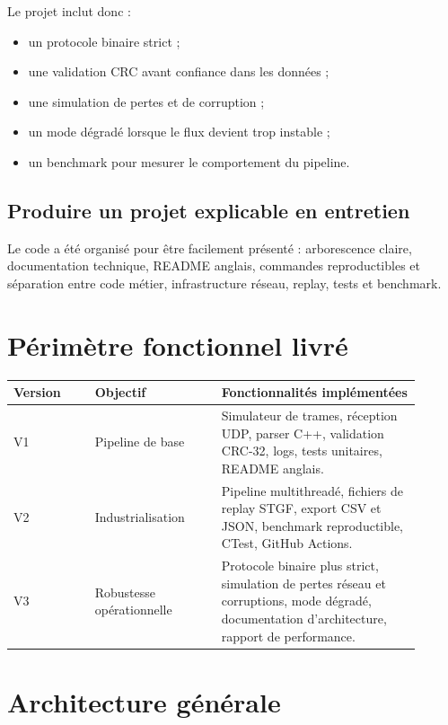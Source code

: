 \documentclass[11pt,a4paper]{article}
\begin{document}
Le projet inclut donc :

\begin{itemize}[nosep]
    \item un protocole binaire strict ;
    \item une validation CRC avant confiance dans les données ;
    \item une simulation de pertes et de corruption ;
    \item un mode dégradé lorsque le flux devient trop instable ;
    \item un benchmark pour mesurer le comportement du pipeline.
\end{itemize}

\subsection{Produire un projet explicable en entretien}

Le code a été organisé pour être facilement présenté : arborescence claire, documentation technique, README anglais, commandes reproductibles et séparation entre code métier, infrastructure réseau, replay, tests et benchmark.

\section{Périmètre fonctionnel livré}

\begin{longtable}{p{0.18\linewidth} p{0.28\linewidth} p{0.44\linewidth}}
\toprule
\textbf{Version} & \textbf{Objectif} & \textbf{Fonctionnalités implémentées} \\
\midrule
V1 & Pipeline de base & Simulateur de trames, réception UDP, parser C++, validation CRC-32, logs, tests unitaires, README anglais. \\
\addlinespace
V2 & Industrialisation & Pipeline multithreadé, fichiers de replay STGF, export CSV et JSON, benchmark reproductible, CTest, GitHub Actions. \\
\addlinespace
V3 & Robustesse opérationnelle & Protocole binaire plus strict, simulation de pertes réseau et corruptions, mode dégradé, documentation d'architecture, rapport de performance. \\
\bottomrule
\end{longtable}

\section{Architecture générale}
\end{document}

